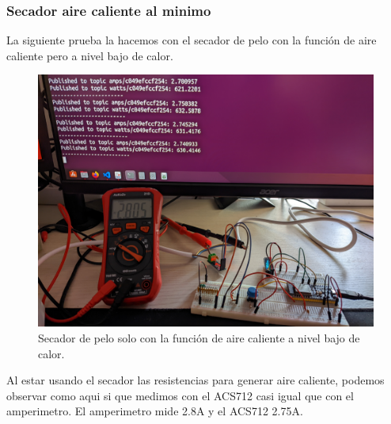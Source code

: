 \begin{titlepage}
\subsubsection{Secador aire caliente al minimo}
La siguiente prueba la hacemos con el secador de pelo con la función de aire caliente pero a nivel bajo de calor.\\
\begin{figure}[h!]
	\centering
	\includegraphics[width=1\textwidth]{imagenes/AC_2_8Amps.jpg}
	\caption{Secador de pelo solo con la función de aire caliente a nivel bajo de calor.}
\end{figure}
\newpage
Al estar usando el secador las resistencias para generar aire caliente, podemos observar como aqui si que medimos con el ACS712 casi igual que con el amperimetro.
El amperimetro mide 2.8A y el ACS712 2.75A. \\

\end{titlepage}

